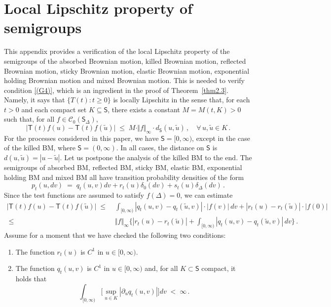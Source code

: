 \documentclass[12pt,a4paper]{article}
\theoremstyle{plain}
\theoremstyle{remark}
\newcommand{\msf}[1]{{\mathsf #1}}
\newcommand{\mc}[1]{{\mathcal #1}}
\newcommand{\p}{\partial}
\begin{document}
			\section{Local Lipschitz property of semigroups}\label{appendixA}
This appendix provides a verification of the local Lipschitz property of the semigroups of the absorbed Brownian motion, killed Brownian motion,
	reflected Brownian motion, sticky Brownian motion, elastic Brownian motion, exponential holding Brownian motion and mixed Brownian motion. This is needed to verify condition \ref{(G4)}, which is an ingredient in the proof of Theorem~\ref{thm2.3}.
	 Namely, it  says that $\{T(t) : t \ge 0\}$ is locally Lipschitz in the sense that, for each $t>0$ and each compact set $K\subseteq \msf{S}$, there exists a constant $M = M(t,K)>0$ such that, for all $f\in \mc{C}_0(\msf S_\Delta)$,
	\begin{equation*}
		\vert  \msf{T}(t)f (u) - \msf{T}(t)f (\tilde{u}) \vert \; \leq \; M\cdot \Vert f\Vert_\infty \cdot  d_{\msf{S}}(u,\tilde{u})\,,\quad \forall\, u,\tilde{u}\in K\,.
	\end{equation*}
	For the processes considered in this paper,  we have $\msf{S} = [0,\infty)$, except  in the case of the killed BM, where $\msf{S} = (0,\infty)$. In all cases, the distance on $\msf{S}$ is $d(u,\tilde{u}) = |u-\tilde{u}|$. Let us postpone the analysis of  the killed BM to the end. The semigroups of absorbed BM, 
	reflected BM, sticky BM, elastic BM, exponential holding BM and mixed BM  all have  transition probability densities of the form 
	\begin{equation*}
		p_t(u, dv) \;=\; q_t(u,v) dv + r_t(u)\delta_0(dv) + s_t(u)\delta_\Delta(dv)\,.
	\end{equation*}
	Since the test functions are assumed to satisfy $f(\Delta)=0$, we can estimate 
	\begin{align*}
		\vert  \msf{T}(t)f (u) - \msf{T}(t)f (\tilde{u}) \vert \; \leq \; &  \int_{[0,\infty)} |q_t(u,v)- q_t(\tilde{u}, v)| \cdot |f(v)| \,dv  +|r_t(u)- r_t(\tilde{u})| \cdot |f(0)|  \\
		\;\leq\; & \Vert f\Vert_\infty \Big\{|r_t(u)- r_t(\tilde{u})|+  \int_{[0,\infty)} |q_t(u,v)- q_t(\tilde{u}, v)| \,dv   \Big\} \,.
	\end{align*}
	Assume for a moment that we have checked the following two conditions:
	\begin{enumerate}[label=(A\arabic*)]
		\item \label{item:lemLIP1} The function $r_t(u)$ is $C^1$ in $u\in [0,\infty)$.
		\item \label{item:lemLIP2} The function $q_t(u,v)$ is $C^1$ in $u\in [0,\infty)$ and, for all $K\subset \msf{S}$ compact, it holds that  
		\begin{equation*}
			\int_{[0,\infty)} \Big[\sup_{u\in K}|\p_u q_t(u,v)|\Big]  dv \;<\;\infty\,.
		\end{equation*}
	\end{enumerate}
\end{document}

